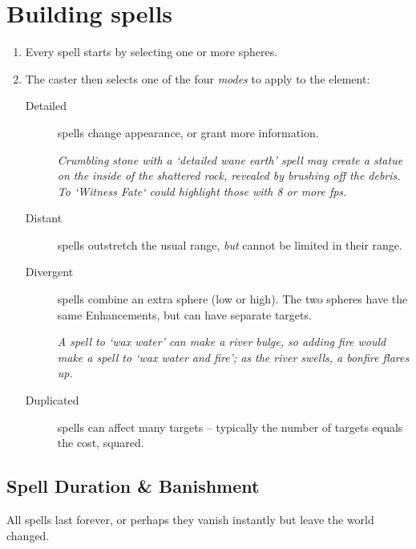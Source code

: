 \section{Building spells}

\begin{multicols}{2}

\begin{enumerate}
  \item
  Every spell starts by selecting one or more spheres.
  \item
  The caster then selects one of the four \textit{modes} to apply to the element:
  \begin{description}
    \item[Detailed]
    spells change appearance, or grant more information.

    \textit{Crumbling stone with a `detailed wane earth' spell may create a statue on the inside of the shattered rock, revealed by brushing off the debris.
    To `Witness Fate` could highlight those with 8 or more \glspl{fp}.}
    \item[Distant]
    spells outstretch the usual range, \emph{but} cannot be limited in their range.
    \item[Divergent]
    spells combine an extra sphere (low or high). The two spheres have the same   Enhancements, but can have separate targets.

    \textit{A spell to `wax water' can make a river bulge, so adding fire would make a spell to `wax water and fire'; as the river swells, a bonfire flares up.}
    \item[Duplicated]
    spells can affect many targets -- typically the number of targets equals the cost, squared.
  \end{description}
\end{enumerate}

\subsection{Spell Duration \& Banishment}

All spells last forever, or perhaps they vanish instantly but leave the world changed.


\end{multicols}
